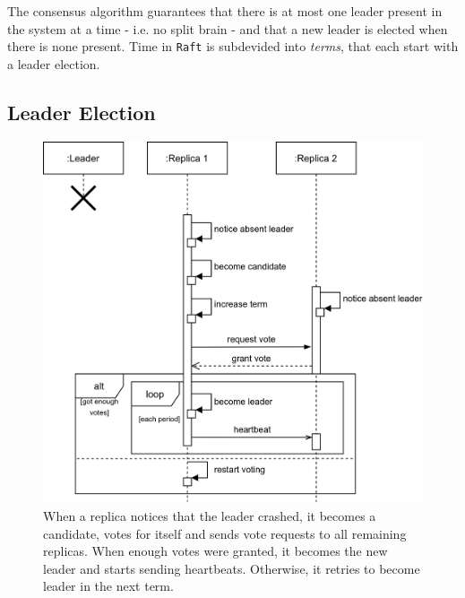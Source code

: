The consensus algorithm guarantees that there is at most one leader present in the system at a time - i.e. no split brain - and that a new leader is elected when there is none present.
Time in \texttt{Raft} is subdevided into \textit{terms}, that each start with a leader election.

\subsection{Leader Election}
\begin{figure}[!hb]
	\centering
	\includegraphics[width=0.75\linewidth]{images/sequence/LeaderElection}
	\caption{When a replica notices that the leader crashed, it becomes a candidate, votes for itself and sends vote requests to all remaining replicas. When enough votes were granted, it becomes the new leader and starts sending heartbeats. Otherwise, it retries to become leader in the next term.}
	\label{fig:SeqLeaderElection}
\end{figure}

